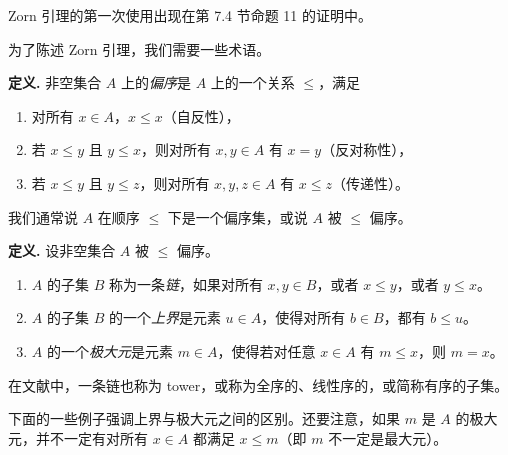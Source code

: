 Zorn 引理的第一次使用出现在第 7.4 节命题 11 的证明中。

为了陈述 Zorn 引理，我们需要一些术语。

\noindent\textbf{定义.} 非空集合 $A$ 上的\emph{偏序}是 $A$ 上的一个关系 $\leq$，满足
\begin{enumerate}[label=(\arabic*)]
  \item 对所有 $x\in A$，$x\leq x$（自反性），
  \item 若 $x\leq y$ 且 $y\leq x$，则对所有 $x,y\in A$ 有 $x=y$（反对称性），
  \item 若 $x\leq y$ 且 $y\leq z$，则对所有 $x,y,z\in A$ 有 $x\leq z$（传递性）。
\end{enumerate}

我们通常说 $A$ 在顺序 $\leq$ 下是一个偏序集，或说 $A$ 被 $\leq$ 偏序。

\noindent\textbf{定义.} 设非空集合 $A$ 被 $\leq$ 偏序。
\begin{enumerate}[label=(\arabic*)]
  \item $A$ 的子集 $B$ 称为一条\emph{链}，如果对所有 $x,y\in B$，或者 $x\leq y$，或者 $y\leq x$。
  \item $A$ 的子集 $B$ 的一个\emph{上界}是元素 $u\in A$，使得对所有 $b\in B$，都有 $b\leq u$。
  \item $A$ 的一个\emph{极大元}是元素 $m\in A$，使得若对任意 $x\in A$ 有 $m\leq x$，则 $m=x$。
\end{enumerate}

在文献中，一条链也称为 tower，或称为全序的、线性序的，或简称有序的子集。

下面的一些例子强调上界与极大元之间的区别。还要注意，如果 $m$ 是 $A$ 的极大元，并不一定有对所有 $x\in A$ 都满足 $x\leq m$（即 $m$ 不一定是最大元）。

